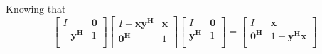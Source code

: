 \documentclass[letterpaper,12pt]{article}
\theoremstyle{definition}
\begin{document}
Knowing that
\[
\begin{bmatrix}
    I & \mathbf{0} \\
    -\mathbf{y^H} & 1 \\
\end{bmatrix}
\begin{bmatrix}
    I-\mathbf{xy^H} & \mathbf{x} \\
    \mathbf{0^H} & 1 \\
\end{bmatrix}
\begin{bmatrix}
    I & \mathbf{0} \\
    \mathbf{y^H} & 1 \\
\end{bmatrix}
=
\begin{bmatrix}
    I & \mathbf{x} \\
    \mathbf{0^H} & 1-\mathbf{y^Hx}  \\
\end{bmatrix}
\]
\end{document}
